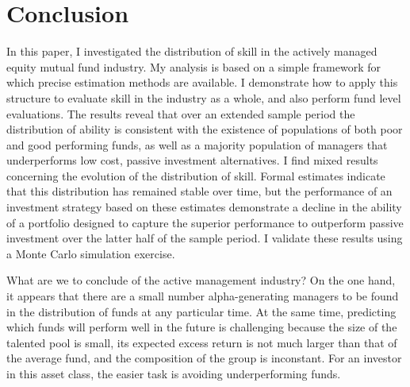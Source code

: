 \section{Conclusion}
	In this paper, I investigated the distribution of skill in the actively managed equity mutual fund industry. My analysis is based on a simple framework for which precise estimation methods are available. I demonstrate how to apply this structure to evaluate skill in the industry as a whole, and also perform fund level evaluations. The results reveal that over an extended sample period the distribution of ability is consistent with the existence of populations of both poor and good performing funds, as well as a majority population of managers that underperforms low cost, passive investment alternatives. I find mixed results concerning the evolution of the distribution of skill. Formal estimates indicate that this distribution has remained stable over time, but the performance of an investment strategy based on these estimates demonstrate a decline in the ability of a portfolio designed to capture the superior performance to outperform passive investment over the latter half of the sample period. I validate these results using a Monte Carlo simulation exercise.

	What are we to conclude of the active management industry? On the one hand, it appears that there are a small number alpha-generating managers to be found in the distribution of funds at any particular time. At the same time, predicting which funds will perform well in the future is challenging because the size of the talented pool is small, its expected excess return is not much larger than that of the average fund, and the composition of the group is inconstant. For an investor in this asset class, the easier task is avoiding underperforming funds.
